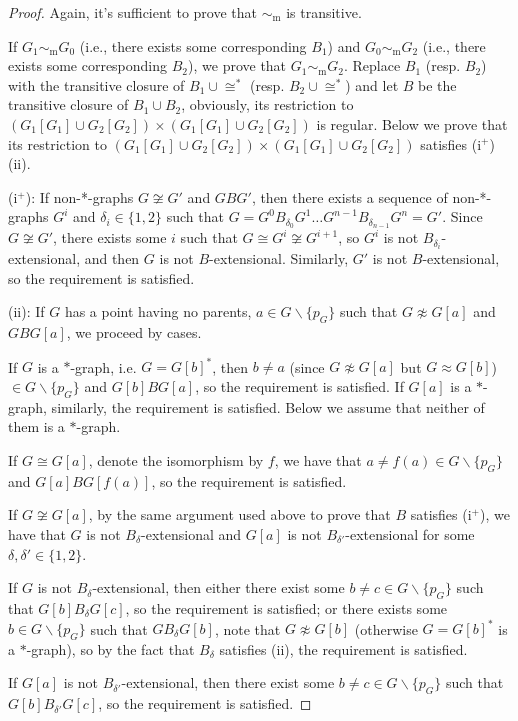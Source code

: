 \documentclass{amsart}
\begin{document}
\begin{proof}
    Again, it's sufficient to prove that $\sim_\mathrm{m}$ is transitive.

    If $G_1\sim_\mathrm{m} G_0$ (i.e., there exists some corresponding $B_1$) and $G_0\sim_\mathrm{m} G_2$ (i.e., there exists some corresponding $B_2$), we prove that $G_1\sim_\mathrm{m} G_2$. Replace $B_1$ (resp. $B_2$) with the transitive closure of $B_1 \cup \cong^*$ (resp. $B_2 \cup \cong^*$) and let $B$ be the transitive closure of $B_1\cup B_2$, obviously, its restriction to $(G_1[G_1]\cup G_2[G_2])\times (G_1[G_1]\cup G_2[G_2])$ is regular.
    Below we prove that its restriction to $(G_1[G_1]\cup G_2[G_2])\times (G_1[G_1]\cup G_2[G_2])$ satisfies (i$^+$)(ii).

    (i$^+$): If non-*-graphs $G\not\cong G'$ and $GBG'$, then there exists a sequence of non-*-graphs $G^i$ and $\delta_i\in\{1,2\}$ such that $G=G^0B_{\delta_0}G^1\dots G^{n-1}B_{\delta_{n-1}}G^n=G'$.
    Since $G\not\cong G'$, there exists some $i$ such that $G\cong G^i\not\cong G^{i+1}$, so $G^i$ is not $B_{\delta_i}$-extensional, and then $G$ is not $B$-extensional.
    Similarly, $G'$ is not $B$-extensional, so the requirement is satisfied.

    (ii): If $G$ has a point having no parents, $a\in G\backslash\{p_G\}$ such that $G\not\approx G[a]$ and $GBG[a]$, we proceed by cases.

    If $G$ is a $*$-graph, i.e. $G=G[b]^*$, then $b\neq a$ (since $G\not\approx G[a]$ but $G\approx G[b]$) $\in G\backslash\{p_G\}$ and $G[b]BG[a]$, so the requirement is satisfied.
    If $G[a]$ is a $*$-graph, similarly, the requirement is satisfied.
    Below we assume that neither of them is a $*$-graph.

    If $G\cong G[a]$, denote the isomorphism by $f$, we have that $a\neq f(a)\in G\backslash\{p_G\}$ and $G[a]BG[f(a)]$, so the requirement is satisfied.

    If $G\not\cong G[a]$, by the same argument used above to prove that $B$ satisfies (i$^+$), we have that $G$ is not $B_{\delta}$-extensional and $G[a]$ is not $B_{\delta'}$-extensional for some $\delta,\delta'\in\{1,2\}$.
    
    If $G$ is not $B_{\delta}$-extensional, then either there exist some $b\neq c\in G\backslash\{p_G\}$ such that $G[b]B_{\delta}G[c]$, so the requirement is satisfied; or there exists some $b\in G\backslash\{p_G\}$ such that $GB_{\delta}G[b]$, note that $G\not\approx G[b]$ (otherwise $G=G[b]^*$ is a $*$-graph), so by the fact that $B_{\delta}$ satisfies (ii), the requirement is satisfied.

    If $G[a]$ is not $B_{\delta'}$-extensional, then there exist some $b\neq c\in G\backslash\{p_G\}$ such that $G[b]B_{\delta'}G[c]$, so the requirement is satisfied.
\end{proof}
\end{document}
